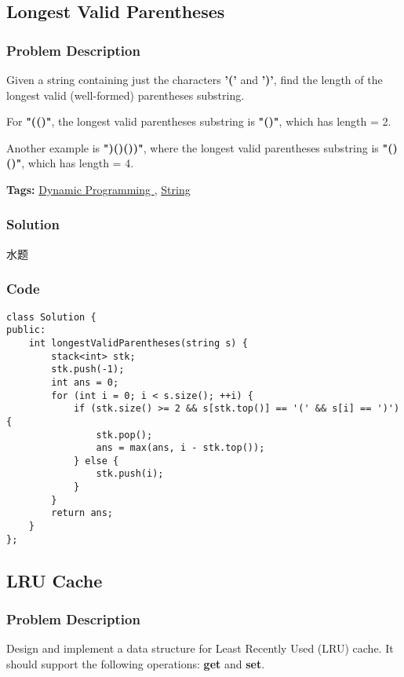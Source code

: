 \documentclass{article}
\begin{document}
\begin{CJK*}{UTF8}{gkai}
\begin{lstlisting}
\end{lstlisting}


\subsection{ Longest Valid Parentheses }
\label{ Longest Valid Parentheses }

\subsubsection*{Problem Description}
Given a string containing just the characters \textbf{'('} and \textbf{')'}, find the length of the longest valid (well-formed) parentheses substring.

For \textbf{"(()"}, the longest valid parentheses substring is \textbf{"()"}, which has length = 2.

Another example is \textbf{")()())"}, where the longest valid parentheses substring is \textbf{"()()"}, which has length = 4.


\textbf{Tags: }
\hyperref[ Dynamic Programming ]{ Dynamic Programming },  \hyperref[ String ]{ String }



\subsubsection*{Solution}
水题

\subsubsection*{Code}
\begin{lstlisting}
class Solution {
public:
    int longestValidParentheses(string s) {
        stack<int> stk;
        stk.push(-1);
        int ans = 0;
        for (int i = 0; i < s.size(); ++i) {
            if (stk.size() >= 2 && s[stk.top()] == '(' && s[i] == ')') {
                stk.pop();
                ans = max(ans, i - stk.top());
            } else {
                stk.push(i);
            }
        }
        return ans;
    }
}; 
\end{lstlisting}


\subsection{ LRU Cache }
\label{ LRU Cache }

\subsubsection*{Problem Description}
Design and implement a data structure for Least Recently Used (LRU) cache. It should support the following operations: \textbf{get} and \textbf{set}.


\end{CJK*}
\end{document}
